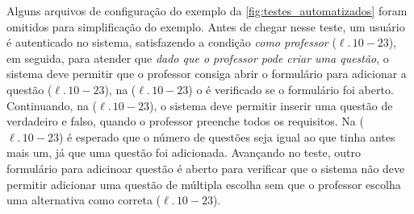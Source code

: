 Alguns arquivos de configuração do exemplo da \autoref{fig:testes_automatizados} foram
omitidos para simplificação do exemplo. Antes de chegar nesse teste, um usuário é autenticado
no sistema, satisfazendo a condição \textit{como professor} ($\ell.\,10-23$), em seguida,
para atender que \textit{dado que o professor pode criar uma questão}, o sistema deve permitir
que o professor consiga abrir o formulário para adicionar a questão ($\ell.\,10-23$), na ($\ell.\,10-23$)
o é verificado se o formulário foi aberto. Continuando, na ($\ell.\,10-23$), o sistema deve
permitir inserir uma questão de verdadeiro e falso, quando o professor preenche todos os requisitos.
Na ($\ell.\,10-23$) é esperado que o número de questões seja igual ao que tinha antes mais um, já que
uma questão foi adicionada. Avançando no teste, outro formulário para adicinoar questão é aberto
para verificar que o sistema não deve permitir adicionar uma questão de múltipla escolha sem que o
professor escolha uma alternativa como correta ($\ell.\,10-23$).

